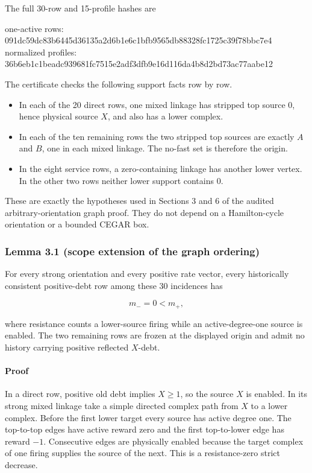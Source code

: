 The full 30-row and 15-profile hashes are

\begin{CodeBlock}
one-active rows:     091dc59dc83b6445d36135a2d6b1e6c1bfb9565db88328fc1725c39f78bbc7e4
normalized profiles: 36b6eb1c1beadc939681fc7515e2adf3dfb9e16d116da4b8d2bd73ac77aabe12
\end{CodeBlock}

The certificate checks the following support facts row by row.

\begin{itemize}
\tightlist
\item
  In each of the 20 direct rows, one mixed linkage has stripped top
  source \(0\), hence physical source \(X\), and also has a lower
  complex.
\item
  In each of the ten remaining rows the two stripped top sources are
  exactly \(A\) and \(B\), one in each mixed linkage. The no-fast set is
  therefore the origin.
\item
  In the eight service rows, a zero-containing linkage has another lower
  vertex. In the other two rows neither lower support contains \(0\).
\end{itemize}

These are exactly the hypotheses used in Sections 3 and 6 of the audited
arbitrary-orientation graph proof. They do not depend on a
Hamilton-cycle orientation or a bounded CEGAR box.

\subsubsection{Lemma 3.1 (scope extension of the graph
ordering)}

For every strong orientation and every positive rate vector, every
historically consistent positive-debt row among these 30 incidences has

\[
 m_-=0<m_+,                                             \tag{3.1}
\]

where resistance counts a lower-source firing while an active-degree-one
source is enabled. The two remaining rows are frozen at the displayed
origin and admit no history carrying positive reflected \(X\)-debt.

\paragraph{Proof}

In a direct row, positive old debt implies \(X\ge1\), so the source
\(X\) is enabled. In its strong mixed linkage take a simple directed
complex path from \(X\) to a lower complex. Before the first lower
target every source has active degree one. The top-to-top edges have
active reward zero and the first top-to-lower edge has reward \(-1\).
Consecutive edges are physically enabled because the target complex of
one firing supplies the source of the next. This is a resistance-zero
strict decrease.

